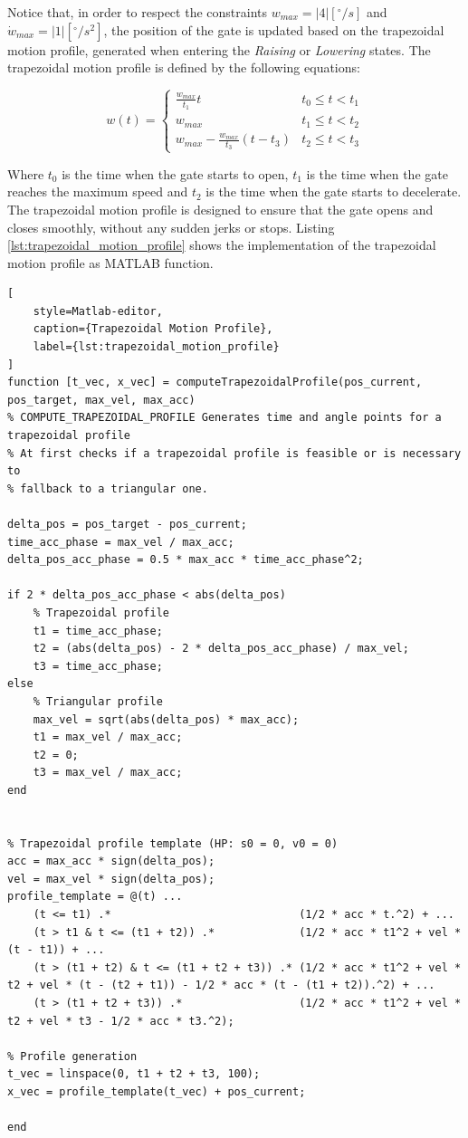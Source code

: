 Notice that, in order to respect the constraints $w_{max} = |4| [^\circ / s]$ and $\dot{w}_{max} = |1| [^\circ / s^2]$, the position of the gate is updated based on the trapezoidal motion profile, generated when entering the \textit{Raising} or \textit{Lowering} states.
The trapezoidal motion profile is defined by the following equations:

\begin{equation}
    w(t) = \begin{cases}
        \frac{w_{max}}{t_1} t                   & t_0 \leq t < t_1 \\
        w_{max}                                 & t_1 \leq t < t_2 \\
        w_{max} - \frac{w_{max}}{t_3} (t - t_3) & t_2 \leq t < t_3
    \end{cases}
\end{equation}

Where $t_0$ is the time when the gate starts to open, $t_1$ is the time when the gate reaches the maximum speed and $t_2$ is the time when the gate starts to decelerate.
The trapezoidal motion profile is designed to ensure that the gate opens and closes smoothly, without any sudden jerks or stops.
Listing \ref{lst:trapezoidal_motion_profile} shows the implementation of the trapezoidal motion profile as MATLAB function.

\begin{lstlisting}[
    style=Matlab-editor,
    caption={Trapezoidal Motion Profile},
    label={lst:trapezoidal_motion_profile}
]
function [t_vec, x_vec] = computeTrapezoidalProfile(pos_current, pos_target, max_vel, max_acc)
% COMPUTE_TRAPEZOIDAL_PROFILE Generates time and angle points for a trapezoidal profile
% At first checks if a trapezoidal profile is feasible or is necessary to
% fallback to a triangular one.

delta_pos = pos_target - pos_current;
time_acc_phase = max_vel / max_acc;
delta_pos_acc_phase = 0.5 * max_acc * time_acc_phase^2;

if 2 * delta_pos_acc_phase < abs(delta_pos)
    % Trapezoidal profile
    t1 = time_acc_phase;
    t2 = (abs(delta_pos) - 2 * delta_pos_acc_phase) / max_vel;
    t3 = time_acc_phase;
else
    % Triangular profile
    max_vel = sqrt(abs(delta_pos) * max_acc);
    t1 = max_vel / max_acc;
    t2 = 0;
    t3 = max_vel / max_acc;
end


% Trapezoidal profile template (HP: s0 = 0, v0 = 0)
acc = max_acc * sign(delta_pos);
vel = max_vel * sign(delta_pos);
profile_template = @(t) ...
    (t <= t1) .*                             (1/2 * acc * t.^2) + ...
    (t > t1 & t <= (t1 + t2)) .*             (1/2 * acc * t1^2 + vel * (t - t1)) + ...
    (t > (t1 + t2) & t <= (t1 + t2 + t3)) .* (1/2 * acc * t1^2 + vel * t2 + vel * (t - (t2 + t1)) - 1/2 * acc * (t - (t1 + t2)).^2) + ...
    (t > (t1 + t2 + t3)) .*                  (1/2 * acc * t1^2 + vel * t2 + vel * t3 - 1/2 * acc * t3.^2);

% Profile generation
t_vec = linspace(0, t1 + t2 + t3, 100);
x_vec = profile_template(t_vec) + pos_current;

end
\end{lstlisting}


